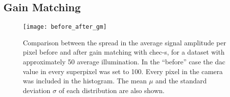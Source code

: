 \subsection{Gain Matching}

\begin{figure}
	\centering
    \texttt{[image: before\_after\_gm]} 
	\caption[Gain-Matching Residuals]{Comparison between the spread in the average signal amplitude per pixel before and after gain matching with \gls{chec-s}, for a dataset with approximately \SI{50}{\pe} average illumination. In the ``before'' case the \gls{dac} value in every superpixel was set to 100. Every pixel in the camera was included in the histogram. The mean $\mu$ and the standard deviation $\sigma$ of each distribution are also shown.} 
	\label{fig:before_after_gm}
\end{figure}

